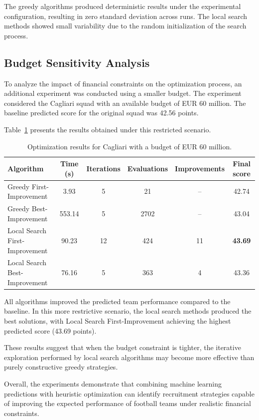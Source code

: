 \documentclass[a4paper,fleqn]{cas-sc}
\begin{document}
The greedy algorithms produced deterministic results under the experimental configuration, resulting in zero standard deviation across
runs. The local search methods showed small variability due to the random initialization of the search process.

\subsection{Budget Sensitivity Analysis}

To analyze the impact of financial constraints on the optimization process, an additional experiment was conducted using a smaller budget.
The experiment considered the Cagliari squad with an available budget of EUR 60 million. The baseline predicted score for the original squad was 42.56 points.

Table~\ref{tab:cagliari_budget} presents the results obtained under
this restricted scenario.

\begin{table}[htbp]
\centering
\caption{Optimization results for Cagliari with a budget of EUR 60 million.}
\label{tab:cagliari_budget}
\begin{tabular}{lccccc}
\toprule
Algorithm & Time (s) & Iterations & Evaluations & Improvements & Final score \\
\midrule
Greedy First-Improvement       & 3.93   & 5  & 21   & -- & 42.74 \\
Greedy Best-Improvement        & 553.14 & 5  & 2702 & -- & 43.04 \\
Local Search First-Improvement & 90.23  & 12 & 424  & 11 & \textbf{43.69} \\
Local Search Best-Improvement  & 76.16  & 5  & 363  & 4  & 43.36 \\
\bottomrule
\end{tabular}
\end{table}

All algorithms improved the predicted team performance compared to the baseline. In this more restrictive scenario, the local search methods
produced the best solutions, with Local Search First-Improvement achieving the highest predicted score (43.69 points).

These results suggest that when the budget constraint is tighter, the iterative exploration performed by local search algorithms may become
more effective than purely constructive greedy strategies.

Overall, the experiments demonstrate that combining machine learning predictions with heuristic optimization can identify recruitment strategies capable 
of improving the expected performance of football teams under realistic financial constraints.
\end{document}
